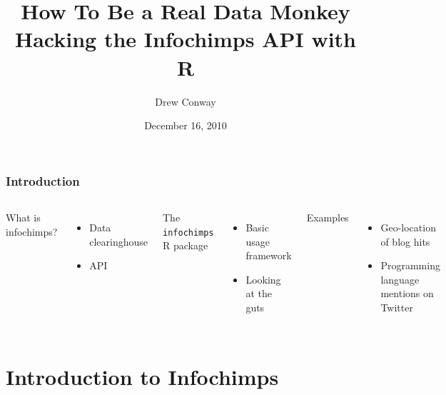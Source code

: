 \documentclass[xcolor=dvipsnames, 9pt,handout]{beamer}
\title{How To Be a Real Data Monkey\\Hacking the Infochimps API with R}
\author{Drew Conway}
\date{December 16, 2010}
\begin{document}
 

\begin{frame}[plain]
  \titlepage  
\end{frame}

\begin{frame}
	\frametitle{Introduction}
	\begin{columns}
            What is infochimps?
            \begin{itemize}
                \item Data clearinghouse
                \item API
            \end{itemize}
            The \texttt{infochimps} R package
            \begin{itemize}
                \item Basic usage framework
                \item Looking at the guts
            \end{itemize}
            Examples
            \begin{itemize}
                \item Geo-location of blog hits
                \item Programming language mentions on Twitter
            \end{itemize}
            \includegraphics[width=5.5cm]{images/monkeys.jpg}
	\end{columns}
\end{frame}

\section{Introduction to Infochimps} %
\label{sec:introduction_to_infochimps}
\end{document}
